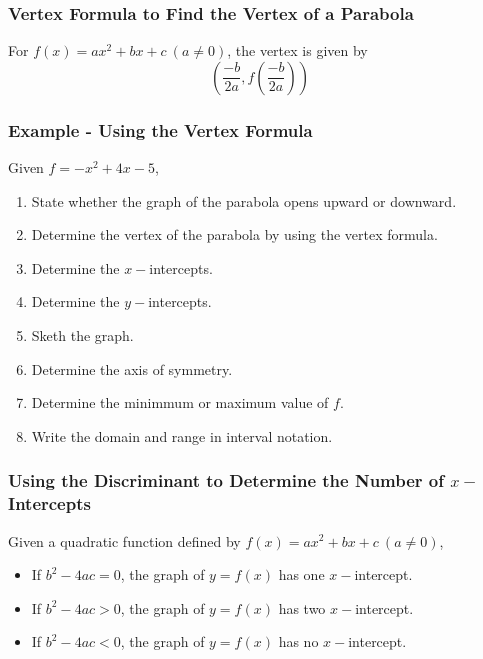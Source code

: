 \documentclass{beamer}
\begin{document}
\begin{frame}
    \frametitle{Vertex Formula to Find the Vertex of a Parabola}

    For \(f(x)=ax^2 +bx +c ~(a \ne 0 )\), the vertex is given by \[\left(\dfrac{-b}{2a},f \left(\dfrac{-b}{2a}\right)\right)\]

    

\end{frame}
\begin{frame}
    \frametitle{Example - Using the Vertex Formula}

    Given \(f =-x^2 +4x -5\),
    \begin{enumerate}
        \item State whether the graph of the parabola opens upward or downward. \pause
        \item Determine the vertex of the parabola by using the vertex formula. \pause
        \item Determine the \(x-\)intercepts. \pause
        \item Determine the \(y-\)intercepts. \pause
        \item Sketh the graph. \pause
        \item Determine the axis of symmetry.  \pause
        \item Determine the minimmum or maximum value of \(f\). \pause
        \item Write the domain and range in interval notation. 
    \end{enumerate} 

\end{frame}

\begin{frame}
    \frametitle{Using the Discriminant to Determine the Number of \(x-\)Intercepts}

    Given a quadratic function defined by \(f(x)= ax^2 +bx +c ~(a \ne 0)\), \pause
    \begin{itemize}
        \item If \(b^2 -4ac =0\), the graph of \(y=f(x)\) has one \(x-\)intercept. \pause
        \item If \(b^2 -4ac >0\), the graph of \(y=f(x)\) has two \(x-\)intercept. \pause
        \item If \(b^2 -4ac < 0\), the graph of \(y=f(x)\) has no \(x-\)intercept. 
    \end{itemize}

\end{frame}
\end{document}
